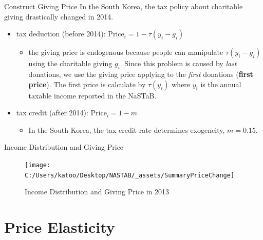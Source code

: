 \documentclass[
  ignorenonframetext,
]{beamer}
\providecommand{\tightlist}{%
  \setlength{\itemsep}{0pt}\setlength{\parskip}{0pt}}
\begin{document}
\begin{frame}{Construct Giving Price}
\protect\hypertarget{construct-giving-price}{}
In the South Korea, the tax policy about charitable giving drastically
changed in 2014.

\begin{itemize}
\tightlist
\item
  tax deduction (before 2014): \(\text{Price}_i = 1 - \tau(y_i - g_i)\)

  \begin{itemize}
  \tightlist
  \item
    the giving price is endogenous because people can manipulate
    \(\tau(y_i - g_i)\) using the charitable giving \(g_i\). Since this
    problem is caused by \emph{last} donations, we use the giving price
    applying to the \emph{first} donations (\textbf{first price}). The
    first price is calculate by \(\tau(y_i)\) where \(y_i\) is the
    annual taxable income reported in the NaSTaB.
  \end{itemize}
\item
  tax credit (after 2014): \(\text{Price}_i = 1 - m\)

  \begin{itemize}
  \tightlist
  \item
    In the South Korea, the tax credit rate determines exogeneity,
    \(m = 0.15\).
  \end{itemize}
\end{itemize}
\end{frame}

\begin{frame}{Income Distribution and Giving Price}
\protect\hypertarget{income-distribution-and-giving-price}{}
\begin{figure}
\texttt{[image: C:/Users/katoo/Desktop/NASTAB/\_assets/SummaryPriceChange]} \caption{Income Distribution and Giving Price in 2013}\label{fig:unnamed-chunk-2}
\end{figure}
\end{frame}

\hypertarget{price-elasticity}{%
\section{Price Elasticity}\label{price-elasticity}}
\end{document}
